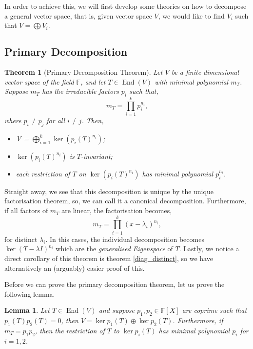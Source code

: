 \documentclass[
]{article}
\newtheorem{theorem}{Theorem}
\newtheorem{lemma}{Lemma}[section]
\theoremstyle{definition}
\begin{document}
In order to achieve this, we will first develop some theories on how to
decompose a general vector space, that is, given vector space \(V\), we
would like to find \(V_i\) such that \(V = \bigoplus V_i\).

\hypertarget{primary-decomposition}{%
\subsection{Primary Decomposition}\label{primary-decomposition}}

\begin{theorem}[Primary Decomposition Theorem]
  Let \(V\) be a finite dimensional vector space of the field \(\mathbb{F}\), and 
  let \(T \in \mathop{\mathrm{End}}(V)\) with minimal polynomial \(m_T\). Suppose \(m_T\) has 
  the irreducible factors \(p_i\) such that,
  \[m_T = \prod_{i = 1}^k p_i^{n_i},\]
  where \(p_i \neq p_j\) for all \(i \neq j\). Then, 
  \begin{itemize}
    \item V = \(\bigoplus_{i = 1}^k \ker(p_i(T)^{n_i})\);
    \item \(\ker(p_i(T)^{n_i})\) is \(T\)-invariant;
    \item each restriction of \(T\) on \(\ker(p_i(T)^{n_i})\) has minimal polynomial 
      \(p_i^{n_i}\).
  \end{itemize}
\end{theorem}

Straight away, we see that this decomposition is unique by the unique
factorisation theorem, so, we can call it a canonical decomposition.
Furthermore, if all factors of \(m_T\) are linear, the factorisation
becomes, \[m_T = \prod_{i = 1}^k (x - \lambda_i)^{n_i},\] for distinct
\(\lambda_i\). In this cases, the individual decomposition becomes
\(\ker (T - \lambda I)^{n_i}\) which are the \emph{generalised
Eigenspace} of \(T\). Lastly, we notice a direct corollary of this
theorem is theorem \ref{diag_distinct}, so we have alternatively an
(arguably) easier proof of this.

Before we can prove the primary decomposition theorem, let us prove the
following lemma.

\begin{lemma}
  Let \(T \in \mathop{\mathrm{End}}(V)\) and suppose \(p_1, p_2 \in \mathbb{F}[X]\) are coprime 
  such that \(p_1(T)p_2(T) = 0\), then \(V = \ker p_1(T) \oplus \ker p_2(T)\). 
  Furthermore, if \(m_T = p_1 p_2\), then the restriction of \(T\) to 
  \(\ker p_i(T)\) has minimal polynomial \(p_i\) for \(i = 1, 2\).
\end{lemma}
\proof
\end{document}

